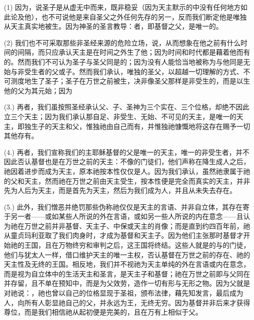 (1) 因为，说圣子是从虚无中而来，既非稳妥（因为天主默示的中没有任何地方如此论及他），也不可说他是来自圣父之外任何先存的另一，反而我们断定他是唯独从天主真实地被生。因为神圣的圣言教导：者，即基督之父，是唯一的。\par

(2) 我们也不可采取那些非圣经来源的危险立场，说，从而想象在他之前有什么时间的间隔，而只应承认天主是在时间之外生了他；因为时间和时代都是藉着他而有的。然而我们不可认为圣子与圣父同是的；因为没有人能恰当地被称为与他同是无始与非受生者的父或子。然而我们承认，唯独的圣父，以超越一切理解的方式、不可测度地生了圣子；圣子在万世之前被生，决非像圣父那样是非受生的，而是以生他的父为其元始；因为\par

(3.) 再者，我们虽按照圣经承认父、子、圣神为三个实在、三个位格，却绝不因此立三个天主；因为我们承认那自足、非受生、无始、不可见的天主，是唯一的天主，即独生子的天主和父，惟独祂由自己而有，并惟独祂慷慨地将这存在赐予一切其他存有。\par

(4.) 再者，我们宣称我们的主耶稣基督的父是唯一的天主，唯一的非受生者，并不因此否认基督也是在万世之前的天主：不像的门徒们，他们声称在降生成人之后，祂因着进步而成为天主，原本祂按本性仅仅是人。因为我们承认，虽然祂隶属于祂的父和天主，然而祂在万世之前由天主受生，按本性便是完全而真实的天主，并非先为人后为天主，而是首先为天主，然后为我们成为人，并且从未失去存在。\par

(5.) 此外，我们憎恶并绝罚那些伪称祂仅仅是天主的言语、并非自立体，其存在寄于另一者——或如某些人所说的外在言语，或如另一些人所说的内在意念——且认为祂在万世之前并非基督、天主子、中保或天主的肖像；而是直到约四百年前，祂从童贞玛利亚取了我们肉身时，才成为基督和天主子。因为他们主张那时基督才开始祂的王国，且在万物终穷和审判之后，这王国将终结。这些人就是的与的门徒，他们与犹太人一样，借口维护天主的唯一主权，否认基督在万世之前的存在、祂的天主性及无终的王国。相反地，我们并不视祂为天主单纯的外在言语或内在意念，而是视为自立体中的生活天主和圣言，是天主子和基督；祂在万世之前即与父同在并存留，且不单在预知中，而是为父效劳，造作一切有形与无形之物。因为父就是对祂说：，祂也曾以自己的位格显现于圣祖，颁布法律，藉先知发言，最后成为人，向所有人彰显祂自己的父，并永远为王，无终无穷。因为基督并非后来才获得尊位，而是我们相信祂从起初便是完美的，且在万有上相似于父。\par

